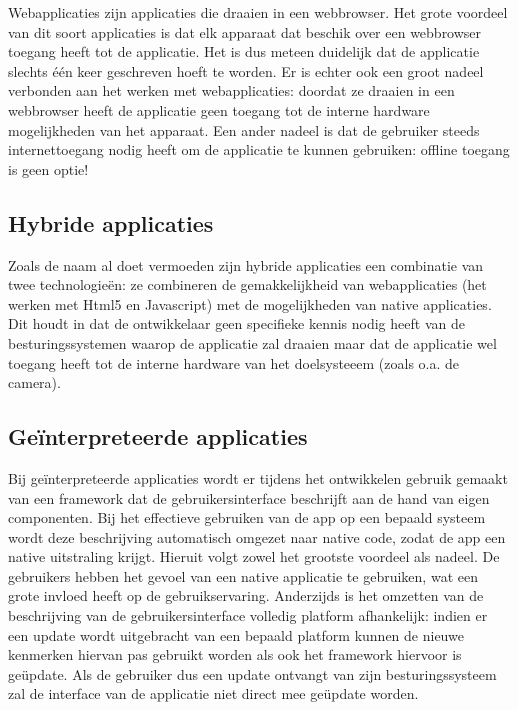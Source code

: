Webapplicaties zijn applicaties die draaien in een webbrowser. Het grote voordeel van dit soort applicaties is dat elk apparaat dat beschik over een webbrowser toegang heeft tot de applicatie. Het is dus meteen duidelijk dat de applicatie slechts één keer geschreven hoeft te worden. Er is echter ook een groot nadeel verbonden aan het werken met webapplicaties: doordat ze draaien in een webbrowser heeft de applicatie geen toegang tot de interne hardware mogelijkheden van het apparaat. Een ander nadeel is dat de gebruiker steeds internettoegang nodig heeft om de applicatie te kunnen gebruiken: offline toegang is geen optie!

\subsection{Hybride applicaties}

Zoals de naam al doet vermoeden zijn hybride applicaties een combinatie van twee technologieën: ze combineren de gemakkelijkheid van webapplicaties (het werken met Html5 en Javascript) met de mogelijkheden van native applicaties. Dit houdt in dat de ontwikkelaar geen specifieke kennis nodig heeft van de besturingssystemen waarop de applicatie zal draaien maar dat de applicatie wel toegang heeft tot de interne hardware van het doelsysteeem (zoals o.a. de camera). 

\subsection{Geïnterpreteerde applicaties}

Bij geïnterpreteerde applicaties wordt er tijdens het ontwikkelen gebruik gemaakt van een framework dat de gebruikersinterface beschrijft aan de hand van eigen componenten. Bij het effectieve gebruiken van de app op een bepaald systeem wordt deze beschrijving automatisch omgezet naar native code, zodat de app een native uitstraling krijgt. Hieruit volgt zowel het grootste voordeel als nadeel. De gebruikers hebben het gevoel van een native applicatie te gebruiken, wat een grote invloed heeft op de gebruikservaring. Anderzijds is het omzetten van de beschrijving van de gebruikersinterface volledig platform afhankelijk: indien er een update wordt uitgebracht van een bepaald platform kunnen de nieuwe kenmerken hiervan pas gebruikt worden als ook het framework hiervoor is geüpdate. Als de gebruiker dus een update ontvangt van zijn besturingssysteem zal de interface van de applicatie niet direct mee geüpdate worden.

